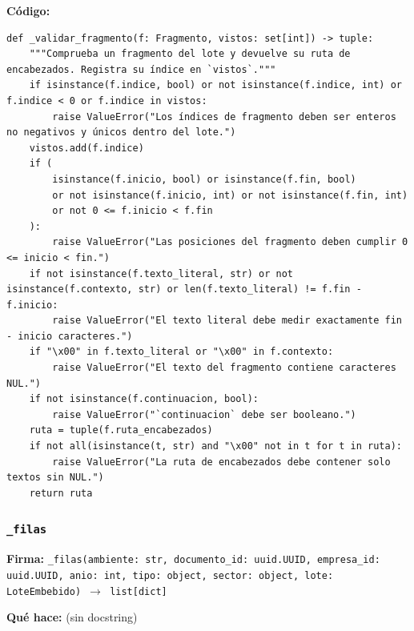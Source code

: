 \documentclass[11pt,a4paper]{article}
\begin{document}
\textbf{Código:}
\begin{lstlisting}
def _validar_fragmento(f: Fragmento, vistos: set[int]) -> tuple:
    """Comprueba un fragmento del lote y devuelve su ruta de encabezados. Registra su índice en `vistos`."""
    if isinstance(f.indice, bool) or not isinstance(f.indice, int) or f.indice < 0 or f.indice in vistos:
        raise ValueError("Los índices de fragmento deben ser enteros no negativos y únicos dentro del lote.")
    vistos.add(f.indice)
    if (
        isinstance(f.inicio, bool) or isinstance(f.fin, bool)
        or not isinstance(f.inicio, int) or not isinstance(f.fin, int)
        or not 0 <= f.inicio < f.fin
    ):
        raise ValueError("Las posiciones del fragmento deben cumplir 0 <= inicio < fin.")
    if not isinstance(f.texto_literal, str) or not isinstance(f.contexto, str) or len(f.texto_literal) != f.fin - f.inicio:
        raise ValueError("El texto literal debe medir exactamente fin - inicio caracteres.")
    if "\x00" in f.texto_literal or "\x00" in f.contexto:
        raise ValueError("El texto del fragmento contiene caracteres NUL.")
    if not isinstance(f.continuacion, bool):
        raise ValueError("`continuacion` debe ser booleano.")
    ruta = tuple(f.ruta_encabezados)
    if not all(isinstance(t, str) and "\x00" not in t for t in ruta):
        raise ValueError("La ruta de encabezados debe contener solo textos sin NUL.")
    return ruta
\end{lstlisting}

\subsubsection*{\texttt{\_filas}}
\textbf{Firma:} \texttt{\_filas(ambiente: str, documento\_id: uuid.UUID, empresa\_id: uuid.UUID, anio: int, tipo: object, sector: object, lote: LoteEmbebido) $\rightarrow$ list[dict]}

\textbf{Qué hace:} (sin docstring)
\end{document}
